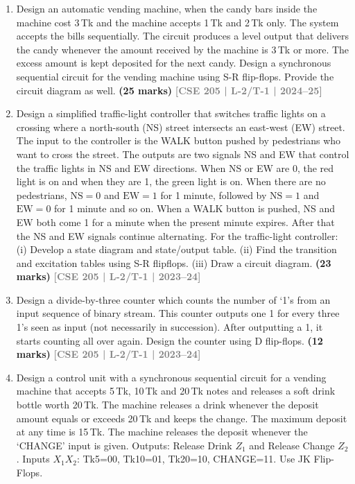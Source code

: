 \documentclass[12pt]{article}
\newcommand{\yr}[1]{\hfill\textcolor{gray}{\small\textbf{[#1]}}}
\newcommand{\mk}[1]{\textcolor{orange!70!black}{\small\textbf{(#1 marks)}}}
\begin{document}
\begin{enumerate}

\item Design an automatic vending machine, when the candy bars inside the machine cost 3\,Tk and the machine accepts 1\,Tk and 2\,Tk only. The system accepts the bills sequentially. The circuit produces a level output that delivers the candy whenever the amount received by the machine is 3\,Tk or more. The excess amount is kept deposited for the next candy. Design a synchronous sequential circuit for the vending machine using S-R flip-flops. Provide the circuit diagram as well.
\mk{25} \yr{CSE 205 | L-2/T-1 | 2024--25}



\item Design a simplified traffic-light controller that switches traffic lights on a crossing where a north-south (NS) street intersects an east-west (EW) street. The input to the controller is the WALK button pushed by pedestrians who want to cross the street. The outputs are two signals NS and EW that control the traffic lights in NS and EW directions. When NS or EW are 0, the red light is on and when they are 1, the green light is on. When there are no pedestrians, $\text{NS}=0$ and $\text{EW}=1$ for 1 minute, followed by $\text{NS}=1$ and $\text{EW}=0$ for 1 minute and so on. When a WALK button is pushed, NS and EW both come 1 for a minute when the present minute expires. After that the NS and EW signals continue alternating. For the traffic-light controller:
	(i) Develop a state diagram and state/output table.
	(ii) Find the transition and excitation tables using S-R flipflops.
	(iii) Draw a circuit diagram.
\mk{23} \yr{CSE 205 | L-2/T-1 | 2023--24}



\item Design a divide-by-three counter which counts the number of `1's from an input sequence of binary stream. This counter outputs one 1 for every three 1's seen as input (not necessarily in succession). After outputting a 1, it starts counting all over again. Design the counter using D flip-flops.
\mk{12} \yr{CSE 205 | L-2/T-1 | 2023--24}




\item Design a control unit with a synchronous sequential circuit for a vending machine that accepts 5\,Tk, 10\,Tk and 20\,Tk notes and releases a soft drink bottle worth 20\,Tk. The machine releases a drink whenever the deposit amount equals or exceeds 20\,Tk and keeps the change. The maximum deposit at any time is 15\,Tk. The machine releases the deposit whenever the `CHANGE' input is given. Outputs: Release Drink $Z_1$ and Release Change $Z_2$. Inputs $X_1X_2$: Tk5=00, Tk10=01, Tk20=10, CHANGE=11. Use JK Flip-Flops.



\end{enumerate}
\end{document}
